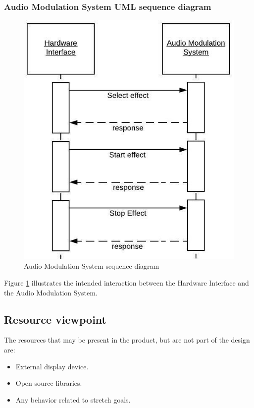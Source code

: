     \subsubsection{Audio Modulation System UML sequence diagram}
        \begin{figure}[!ht]
            \centering
            \includegraphics[width=.45\textwidth]{diagrams/modulation-interaction-revised.jpeg}
            \caption{Audio Modulation System sequence diagram}
            \label{fig:modulation}
        \end{figure}
        Figure \ref{fig:modulation} illustrates the intended interaction between the Hardware Interface and the Audio Modulation System.
        


\subsection{Resource viewpoint}
    The resources that may be present in the product, but are not part of the design are:
    \begin{itemize}
        \item External display device.
        \item Open source libraries.
        \item Any behavior related to stretch goals.
    \end{itemize}